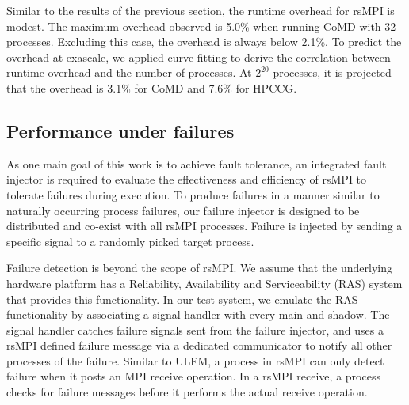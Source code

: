 Similar to the results of the previous section, the runtime overhead for rsMPI is modest. The maximum overhead observed is 5.0\% when running CoMD with 32 processes. Excluding this case, the overhead is always below 2.1\%. To predict the overhead at exascale, we applied curve fitting to derive the correlation between runtime overhead and the number of processes. At $2^{20}$ processes, it is projected that the overhead is 3.1\% for CoMD and 7.6\% for HPCCG. 


\subsection{Performance under failures}

As one main goal of this work is to achieve fault tolerance, an integrated fault injector is required to evaluate the effectiveness and efficiency of rsMPI to tolerate failures during execution. To produce failures in a manner similar to naturally occurring process failures, our failure injector is designed to be distributed and co-exist with all rsMPI processes. Failure is injected by sending a specific signal to a randomly picked target process.

Failure detection is beyond the scope of rsMPI. We assume that the underlying hardware platform has a Reliability, Availability and Serviceability (RAS) system that provides this functionality. In our test system, we emulate the RAS functionality by associating a signal handler with every main and shadow. The signal handler catches failure signals sent from the failure injector, and uses a rsMPI defined failure message via a dedicated communicator to notify all other processes of the failure. 
Similar to ULFM, a process in rsMPI can only detect failure when it posts an MPI receive operation. In a rsMPI receive, 
a process checks for failure messages before it performs the actual receive operation.

